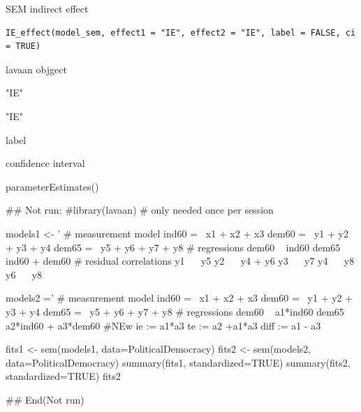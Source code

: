 \documentclass[a4paper]{book}
\begin{document}
%
\begin{Description}
SEM indirect effect
\end{Description}
%
\begin{Usage}
\begin{verbatim}
IE_effect(model_sem, effect1 = "IE", effect2 = "IE", label = FALSE, ci = TRUE)
\end{verbatim}
\end{Usage}
%
\begin{Arguments}
\begin{ldescription}
\item[\code{model\_sem}] lavaan objgect

\item[\code{effect1}] "IE"

\item[\code{effect2}] "IE"

\item[\code{label}] label

\item[\code{ci}] confidence interval
\end{ldescription}
\end{Arguments}
%
\begin{Value}
parameterEstimates()
\end{Value}
%
\begin{Examples}
\begin{ExampleCode}

\#\# Not run: 
#library(lavaan) # only needed once per session

models1 <- '
  # measurement model
    ind60 =~ x1 + x2 + x3
    dem60 =~ y1 + y2 + y3 + y4
    dem65 =~ y5 + y6 + y7 + y8
    # regressions
    dem60 ~ ind60
    dem65 ~ ind60 + dem60
      # residual correlations
    y1 ~~ y5
    y2 ~~ y4 + y6
    y3 ~~ y7
    y4 ~~ y8
    y6 ~~ y8

models2 ='
  # measurement model
    ind60 =~ x1 + x2 + x3
    dem60 =~ y1 + y2 + y3 + y4
    dem65 =~ y5 + y6 + y7 + y8
     # regressions
    dem60 ~ a1*ind60
    dem65 ~ a2*ind60 + a3*dem60
 #NEw
   ie := a1*a3
   te := a2 +a1*a3
   diff := a1 - a3




fits1 <- sem(models1, data=PoliticalDemocracy)
fits2 <- sem(models2, data=PoliticalDemocracy)
summary(fits1, standardized=TRUE)
summary(fits2, standardized=TRUE)
fits2 %

## End(Not run)

\end{ExampleCode}
\end{Examples}
\end{document}
